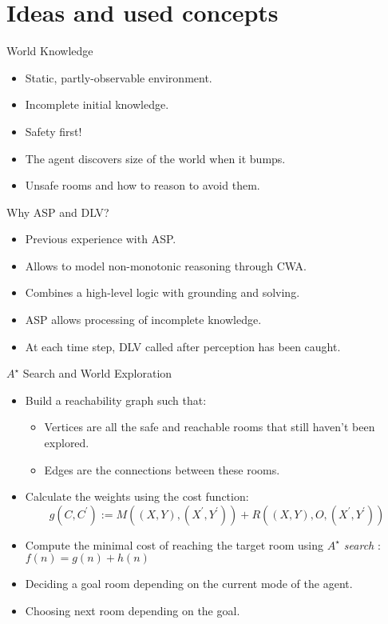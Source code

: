 \documentclass[smaller,dvipsnames,ratio=169]{beamer}
\begin{document}
  \section{Ideas and used concepts}
	 \begin{frame}{World Knowledge}
	
	  \begin{itemize}
		\item Static, partly-observable environment.
		\item Incomplete initial knowledge.
		\item Safety first!
		\item The agent discovers size of the world when it bumps. 
		\item Unsafe rooms and how to reason to avoid them. 
	  \end{itemize}
	 \end{frame}

 \begin{frame}{Why ASP and DLV?}
	\begin{itemize}
		\item Previous experience with ASP.
		\item Allows to model non-monotonic reasoning through CWA. 
		\item Combines a high-level
		logic with grounding and solving. 
		\item ASP allows processing of incomplete knowledge. 
		\item At each time step, DLV called after perception has been caught.
		
	\end{itemize}
 \end{frame}

  \begin{frame}{$A^{\star}$ Search and World Exploration}
	 \begin{itemize}
	 	\item Build a reachability graph such that:
		 	\begin{itemize}
				 \item Vertices are all the safe and reachable rooms that still haven't been explored.
				 \item Edges are the connections between these rooms.
		    \end{itemize}
	    \item Calculate the weights using the cost function: 
	    $$
	    	g(C,C^\prime) := M((X,Y),(X^\prime,Y^\prime)) + R((X,Y),O,(X^\prime,Y^\prime))
	    $$
	    \item Compute the minimal cost of reaching the target room using \emph{$A^{\star}$ search} : 
	    \(f(n) = g(n) + h(n)\)
	    \item Deciding a goal room depending on the current mode of the agent.
	    \item Choosing next room depending on the goal.
		 
	 \end{itemize}
  \end{frame}
\end{document}

